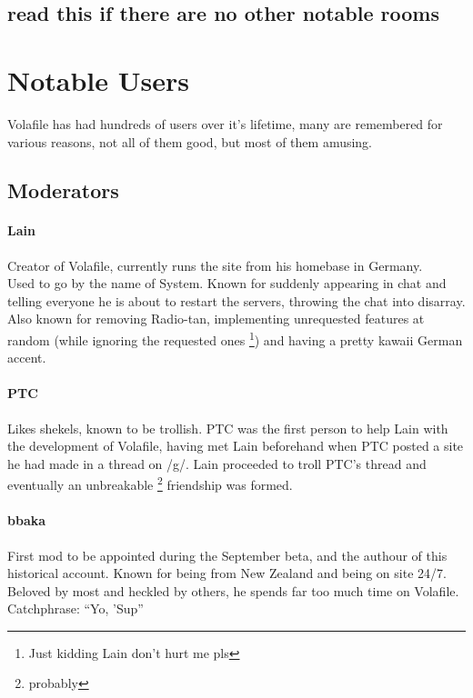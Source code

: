 \documentclass[12pt]{report}
\begin{document}
{{        \section{read this if there are no other notable rooms}
        \chapter{Notable Users}
        Volafile has had hundreds of users over it's lifetime, many are remembered for various reasons, not all of them good, but most of them amusing.

        \section{Moderators}

        \subsubsection{Lain}
        Creator of Volafile, currently runs the site from his homebase in Germany. \\
        Used to go by the name of System. Known for suddenly appearing in
        chat and telling everyone he is about to restart the servers,
        throwing  the chat into disarray. Also known for removing Radio-tan,
        implementing unrequested features at random (while ignoring the requested ones
        \footnote{Just kidding Lain don't hurt me pls})
        and having a pretty kawaii German accent.

        \subsubsection{PTC}
        Likes shekels, known to be trollish. PTC was the first person to help
        Lain with the development of Volafile, having met Lain beforehand
        when PTC posted a site he had made in a thread on /g/.
        Lain proceeded to troll PTC's thread and eventually an unbreakable
        \footnote{probably}
        friendship was formed.

        \subsubsection{bbaka}
        First mod to be appointed during the September beta, and the authour
        of this historical account. Known for being from New Zealand and
        being on site 24/7. Beloved by most and heckled by others, he
        spends far too much time on Volafile. Catchphrase: ``Yo, 'Sup''

}}
\end{document}
